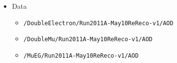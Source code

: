 \begin{itemize}
\item Data 
\begin{itemize}
\item \verb=/DoubleElectron/Run2011A-May10ReReco-v1/AOD=
\item \verb=/DoubleMu/Run2011A-May10ReReco-v1/AOD=
\item \verb=/MuEG/Run2011A-May10ReReco-v1/AOD=

\end{itemize}


\end{itemize}

